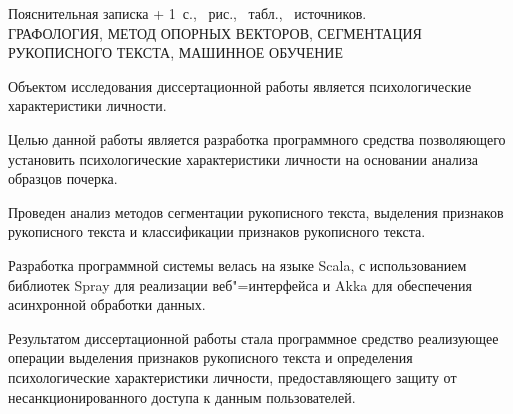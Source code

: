 
\newcommand{\totpages}{\number\numexpr\getpagerefnumber{LastPage} + 1}

\begin{center}
    Пояснительная записка \totpages~с., \totfig{}~рис., \tottab{}~табл., \totref{}~источников.
    \\ 
    \MakeUppercase{графология, метод опорных векторов, сегментация рукописного текста, машинное обучение}
\end{center}

Объектом исследования диссертационной работы является психологические характеристики личности.

Целью данной работы является разработка программного средства позволяющего установить психологические характеристики личности на основании анализа образцов почерка.

Проведен анализ методов сегментации рукописного текста, выделения признаков рукописного текста и классификации признаков рукописного текста.

Разработка программной системы велась на языке Scala, с использованием библиотек Spray для реализации веб"=интерфейса и Akka для обеспечения асинхронной обработки данных. 

Результатом диссертационной работы стала программное средство реализующее операции выделения признаков рукописного текста и определения психологические характеристики личности, предоставляющего защиту от несанкционированного доступа к данным пользователей.

\clearpage